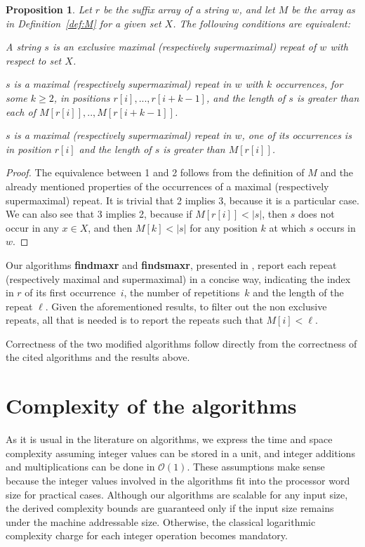 \documentclass[submission]{dmtcs}
\newcommand{\Ode}{{\mathcal O}}
\newcommand\+[1]{\mathcal{#1}}
\newtheorem{proposition}[theorem]{Proposition}
\newenvironment{my_enumerate}{\begin{enumerate}
  \setlength{\itemsep}{1pt}
  \setlength{\parskip}{0pt}
  \setlength{\parsep}{0pt}}{\end{enumerate}}
\begin{document}
\begin{proposition}\label{prop:exclusive}
Let $r$ be the suffix array of a string $w$, and let $M$ be the array
as in Definition~\ref{def:M} for a given set $X$.
The following conditions are equivalent:
\begin{my_enumerate}
\item A string $s$ is an exclusive maximal  (respectively
	supermaximal) repeat of $w$ with respect to set	$X$.

\item $s$ is a maximal (respectively supermaximal) repeat in $w$ with
	$k$ occurrences, for some $k\geq 2$, in positions $r[i],...,r[i+k-1]$,
	and the length of $s$ is greater than each of $M[r[i]],..,M[r[i+k-1]]$.

\item $s$ is a maximal (respectively supermaximal) repeat in $w$, one of its
	occurrences is in position $r[i]$ and the length of $s$ is greater than
	$M[r[i]]$.
\end{my_enumerate}
\end{proposition}
\begin{proof}
The equivalence between 1 and 2 follows from the definition of $M$ and the
already mentioned properties of the occurrences of a maximal (respectively
supermaximal) repeat.
It is trivial that 2 implies 3, because it is a particular case. We can also
see that 3 implies 2, because if $M[r[i]] < |s|$, then $s$ does not occur in
any $x \in X$, and then $M[k] < |s|$ for any position $k$ at which $s$ occurs
in $w$.
\end{proof}

Our algorithms   {\bf findmaxr} and {\bf findsmaxr}, 
presented in \cite{findmaxr,bdh}, report each repeat (respectively maximal and
supermaximal) in a concise way, indicating the index in $r$ of its first
occurrence~$i$, the number of repetitions~$k$ and the length of the repeat
$\ell$. Given the aforementioned results, to filter out the non exclusive
repeats, all that is needed is to report the repeats such that
$M[i] < \ell$.

Correctness of the two modified algorithms follow directly from the correctness
of the cited algorithms and the results above.
 
\section{Complexity of the algorithms}

As it is usual in the literature on algorithms, we express the time and space
complexity assuming integer values can be stored in a unit, and integer 
additions and multiplications can be done in $\Ode(1)$.
These assumptions make sense because the integer values
involved in the algorithms fit into the processor word size
for practical cases.
Although our algorithms are scalable for any input size,
the derived complexity bounds are guaranteed only
if the input size remains under the machine addressable size.
Otherwise, the classical logarithmic complexity charge for each integer
operation becomes mandatory.
\end{document}
